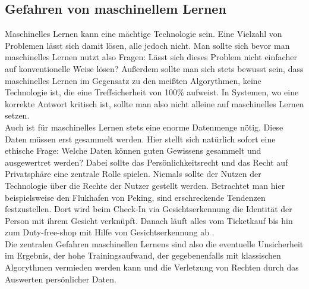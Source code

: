 \documentclass{article}
\begin{document}
\subsection{Gefahren von maschinellem Lernen}
Maschinelles Lernen kann eine mächtige Technologie sein. Eine Vielzahl von Problemen lässt sich damit lösen, alle jedoch nicht. Man sollte sich bevor man maschinelles Lernen nutzt also Fragen: Lässt sich dieses Problem nicht einfacher auf konventionelle Weise lösen? Außerdem sollte man sich stets bewusst sein, dass maschinelles Lernen im Gegensatz zu den meißten Algorythmen, keine Technologie ist, die eine Treffsicherheit von 100\% aufweist. In Systemen, wo eine korrekte Antwort kritisch ist, sollte man also nicht alleine auf maschinelles Lernen setzen.\\
Auch ist für maschinelles Lernen stets eine enorme Datenmenge nötig. Diese Daten müssen erst gesammelt werden. Hier stellt sich natürlich sofort eine ethische Frage: Welche Daten können guten Gewissens gesammelt und ausgewertret werden? Dabei sollte das Persönlichkeitsrecht und das Recht auf Privatsphäre eine zentrale Rolle spielen. Niemals sollte der Nutzen der Technologie über die Rechte der Nutzer gestellt werden. Betrachtet man hier beispielsweise den Flukhafen von Peking, sind erschreckende Tendenzen festzustellen. Dort wird beim Check-In via Gesichtserkennung die Identität der Person mit ihrem Gesicht verknüpft. Danach läuft alles vom Ticketkauf bis hin zum Duty-free-shop mit Hilfe von Gesichtserkennung ab \cite{4}.\\
Die zentralen Gefahren maschinellen Lernens sind also die eventuelle Unsicherheit im Ergebnis, der hohe Trainingsaufwand, der gegebenenfalls mit klassischen Algorythmen vermieden werden kann und die Verletzung von Rechten durch das Auswerten persönlicher Daten.
\end{document}
